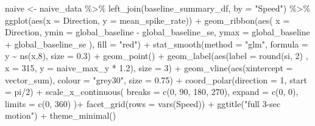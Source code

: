 \documentclass[
]{book}
\newenvironment{Shaded}{\begin{snugshade}}{\end{snugshade}}
\newcommand{\AttributeTok}[1]{\textcolor[rgb]{0.77,0.63,0.00}{#1}}
\newcommand{\DecValTok}[1]{\textcolor[rgb]{0.00,0.00,0.81}{#1}}
\newcommand{\FloatTok}[1]{\textcolor[rgb]{0.00,0.00,0.81}{#1}}
\newcommand{\FunctionTok}[1]{\textcolor[rgb]{0.00,0.00,0.00}{#1}}
\newcommand{\NormalTok}[1]{#1}
\newcommand{\OtherTok}[1]{\textcolor[rgb]{0.56,0.35,0.01}{#1}}
\newcommand{\SpecialCharTok}[1]{\textcolor[rgb]{0.00,0.00,0.00}{#1}}
\newcommand{\StringTok}[1]{\textcolor[rgb]{0.31,0.60,0.02}{#1}}
\begin{document}
\begin{Shaded}
\begin{Highlighting}[]
\NormalTok{naive }\OtherTok{\textless{}{-}}
\NormalTok{  naive\_data }\SpecialCharTok{\%\textgreater{}\%}
  \FunctionTok{left\_join}\NormalTok{(baseline\_summary\_df, }\AttributeTok{by =} \StringTok{"Speed"}\NormalTok{) }\SpecialCharTok{\%\textgreater{}\%}
  \FunctionTok{ggplot}\NormalTok{(}\FunctionTok{aes}\NormalTok{(}\AttributeTok{x =}\NormalTok{ Direction, }\AttributeTok{y =}\NormalTok{ mean\_spike\_rate)) }\SpecialCharTok{+}
  \FunctionTok{geom\_ribbon}\NormalTok{(}\FunctionTok{aes}\NormalTok{(}
    \AttributeTok{x =}\NormalTok{ Direction,}
    \AttributeTok{ymin =}\NormalTok{ global\_baseline }\SpecialCharTok{{-}}\NormalTok{ global\_baseline\_se,}
    \AttributeTok{ymax =}\NormalTok{ global\_baseline }\SpecialCharTok{+}\NormalTok{ global\_baseline\_se}
\NormalTok{  ),}
  \AttributeTok{fill =} \StringTok{"red"}\NormalTok{) }\SpecialCharTok{+}
  \FunctionTok{stat\_smooth}\NormalTok{(}\AttributeTok{method =} \StringTok{"glm"}\NormalTok{, }\AttributeTok{formula =}\NormalTok{ y }\SpecialCharTok{\textasciitilde{}} \FunctionTok{ns}\NormalTok{(x,}\DecValTok{8}\NormalTok{), }\AttributeTok{size =} \FloatTok{0.3}\NormalTok{) }\SpecialCharTok{+}
  \FunctionTok{geom\_point}\NormalTok{() }\SpecialCharTok{+}
  \FunctionTok{geom\_label}\NormalTok{(}\FunctionTok{aes}\NormalTok{(}\AttributeTok{label =} \FunctionTok{round}\NormalTok{(si, }\DecValTok{2}\NormalTok{) , }\AttributeTok{x =} \DecValTok{315}\NormalTok{, }\AttributeTok{y =}\NormalTok{ naive\_max\_y }\SpecialCharTok{*} \FloatTok{1.2}\NormalTok{),}
             \AttributeTok{size =} \DecValTok{3}\NormalTok{) }\SpecialCharTok{+}
  \FunctionTok{geom\_vline}\NormalTok{(}\FunctionTok{aes}\NormalTok{(}\AttributeTok{xintercept =}\NormalTok{ vector\_sum), }\AttributeTok{colour =} \StringTok{"grey30"}\NormalTok{,}
             \AttributeTok{size =} \FloatTok{0.75}\NormalTok{) }\SpecialCharTok{+}
  \FunctionTok{coord\_polar}\NormalTok{(}\AttributeTok{direction =} \DecValTok{1}\NormalTok{, }\AttributeTok{start =}\NormalTok{ pi}\SpecialCharTok{/}\DecValTok{2}\NormalTok{) }\SpecialCharTok{+}
  \FunctionTok{scale\_x\_continuous}\NormalTok{(}
    \AttributeTok{breaks =} \FunctionTok{c}\NormalTok{(}\DecValTok{0}\NormalTok{, }\DecValTok{90}\NormalTok{, }\DecValTok{180}\NormalTok{, }\DecValTok{270}\NormalTok{),}
    \AttributeTok{expand =} \FunctionTok{c}\NormalTok{(}\DecValTok{0}\NormalTok{, }\DecValTok{0}\NormalTok{),}
    \AttributeTok{limits =} \FunctionTok{c}\NormalTok{(}\DecValTok{0}\NormalTok{, }\DecValTok{360}\NormalTok{)}
\NormalTok{  )}\SpecialCharTok{+}
  \FunctionTok{facet\_grid}\NormalTok{(}\AttributeTok{rows =} \FunctionTok{vars}\NormalTok{(Speed)) }\SpecialCharTok{+}
  \FunctionTok{ggtitle}\NormalTok{(}\StringTok{"full 3{-}sec motion"}\NormalTok{) }\SpecialCharTok{+}
  \FunctionTok{theme\_minimal}\NormalTok{()}
\end{Highlighting}
\end{Shaded}
\end{document}
